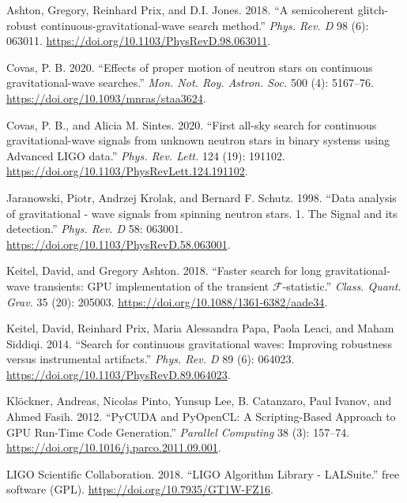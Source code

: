 \documentclass[10pt,a4paper,onecolumn]{article}
\begin{document}
\leavevmode\hypertarget{ref-Ashton:2018qth}{}%
Ashton, Gregory, Reinhard Prix, and D.I. Jones. 2018. ``A semicoherent
glitch-robust continuous-gravitational-wave search method.'' \emph{Phys.
Rev. D} 98 (6): 063011.
\url{https://doi.org/10.1103/PhysRevD.98.063011}.

\leavevmode\hypertarget{ref-Covas:2020hcy}{}%
Covas, P. B. 2020. ``Effects of proper motion of neutron stars on
continuous gravitational-wave searches.'' \emph{Mon. Not. Roy. Astron.
Soc.} 500 (4): 5167--76. \url{https://doi.org/10.1093/mnras/staa3624}.

\leavevmode\hypertarget{ref-Covas:2020nwy}{}%
Covas, P. B., and Alicia M. Sintes. 2020. ``First all-sky search for
continuous gravitational-wave signals from unknown neutron stars in
binary systems using Advanced LIGO data.'' \emph{Phys. Rev. Lett.} 124
(19): 191102. \url{https://doi.org/10.1103/PhysRevLett.124.191102}.

\leavevmode\hypertarget{ref-Jaranowski:1998qm}{}%
Jaranowski, Piotr, Andrzej Krolak, and Bernard F. Schutz. 1998. ``Data
analysis of gravitational - wave signals from spinning neutron stars. 1.
The Signal and its detection.'' \emph{Phys. Rev. D} 58: 063001.
\url{https://doi.org/10.1103/PhysRevD.58.063001}.

\leavevmode\hypertarget{ref-Keitel:2018pxz}{}%
Keitel, David, and Gregory Ashton. 2018. ``Faster search for long
gravitational-wave transients: GPU implementation of the transient
\(\mathcal F\)-statistic.'' \emph{Class. Quant. Grav.} 35 (20): 205003.
\url{https://doi.org/10.1088/1361-6382/aade34}.

\leavevmode\hypertarget{ref-Keitel:2013wga}{}%
Keitel, David, Reinhard Prix, Maria Alessandra Papa, Paola Leaci, and
Maham Siddiqi. 2014. ``Search for continuous gravitational waves:
Improving robustness versus instrumental artifacts.'' \emph{Phys. Rev.
D} 89 (6): 064023. \url{https://doi.org/10.1103/PhysRevD.89.064023}.

\leavevmode\hypertarget{ref-Kloeckner:2012pyc}{}%
Klöckner, Andreas, Nicolas Pinto, Yunsup Lee, B. Catanzaro, Paul Ivanov,
and Ahmed Fasih. 2012. ``PyCUDA and PyOpenCL: A Scripting-Based Approach
to GPU Run-Time Code Generation.'' \emph{Parallel Computing} 38 (3):
157--74. \url{https://doi.org/10.1016/j.parco.2011.09.001}.

\leavevmode\hypertarget{ref-lalsuite}{}%
LIGO Scientific Collaboration. 2018. ``LIGO Algorithm Library -
LALSuite.'' free software (GPL).
\url{https://doi.org/10.7935/GT1W-FZ16}.
\end{document}

